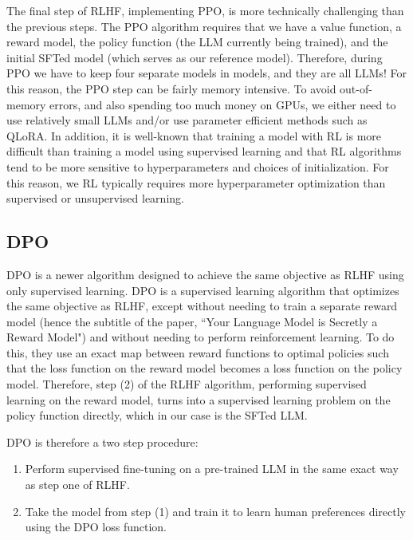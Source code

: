 \documentclass[11pt, oneside]{article}   	%
\begin{document}
The final step of RLHF, implementing PPO, is more technically challenging than the previous steps.
The PPO algorithm requires that we have a value function, a reward model, the policy function (the LLM currently being trained), and the initial SFTed model (which serves as our reference model). 
Therefore, during PPO we have to keep four separate models in models, and they are all LLMs!
For this reason, the PPO step can be fairly memory intensive.
To avoid out-of-memory errors, and also spending too much money on GPUs, we either need to use relatively small LLMs and/or use parameter efficient methods such as QLoRA.
In addition, it is well-known that training a model with RL is more difficult than training a model using supervised learning and that RL algorithms tend to be more sensitive to hyperparameters and choices of initialization.
For this reason, we RL typically requires more hyperparameter optimization than supervised or unsupervised learning.

\subsection{DPO}
DPO is a newer algorithm designed to achieve the same objective as RLHF using only supervised learning.
DPO is a supervised learning algorithm that optimizes the same objective as RLHF, except without needing to train a separate reward model (hence the subtitle of the paper, ``Your Language Model is Secretly a Reward Model") and without needing to perform reinforcement learning.
To do this, they use an exact map between reward functions to optimal policies such that the loss function on the reward model becomes a loss function on the policy model.
Therefore, step (2) of the RLHF algorithm, performing supervised learning on the reward model, turns into a supervised learning problem on the policy function directly, which in our case is the SFTed LLM.

DPO is therefore a two step procedure:
\begin{enumerate}
\item Perform supervised fine-tuning on a pre-trained LLM in the same exact way as step one of RLHF.
\item Take the model from step (1) and train it to learn human preferences directly using the DPO loss function.  
\end{enumerate} 
\end{document}
